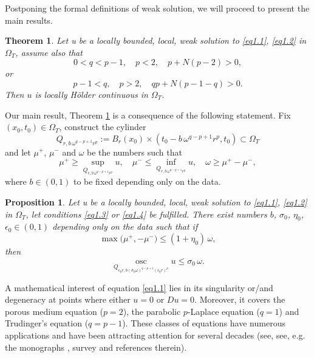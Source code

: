 \documentclass[a4paper,11pt,fullpage]{article}
\DeclareMathOperator*{\osc}{osc}
\numberwithin{equation}{section}
\newtheorem{theorem}{Theorem}[section]
\newtheorem{propo}{Proposition}[section]
\begin{document}
 
Postponing the formal definitions of weak solution, we will proceed to present the main results. 
\begin{theorem}\label{th1.1}
Let u be a locally bounded, local, weak solution to \eqref{eq1.1}, \eqref{eq1.2} in $\Omega_T$, assume also that 
\begin{equation}\label{eq1.3}
0<q<p-1,\quad p<2,\quad p+N(p-2)>0,
\end{equation}
or
\begin{equation}\label{eq1.4}
p-1<q, \quad p>2, \quad q p+N(p-1-q)>0.
\end{equation}
Then $u$ is locally H\"{o}lder continuous in $\Omega_T$.
\end{theorem}

Our main result, Theorem \ref{th1.1} is a consequence of the following statement. Fix $(x_0, t_0)\in \Omega_T$, construct the cylinder
$$Q_{r, b\, \omega^{q-p+1} r^p}:=B_r(x_0)\times (t_0- b\,\omega^{q-p+1} r^p, t_0)\subset \Omega_T$$ 
and let $\mu^+$, $\mu^-$ and $\omega$ be the numbers such that
\begin{equation}\label{eq1.5}
\mu^+\geqslant \sup\limits_{Q_{r, b\,\omega^{q-p+1} r^p}} u,\quad \mu^-\leqslant \inf\limits_{Q_{r, b\, \omega^{q-p+1} r^p}} u,\quad \omega \geqslant \mu^+ -\mu^-,
\end{equation}
where $b\in (0, 1)$ to be fixed depending only on the data.

\begin{propo}\label{pr1.1}
Let u be a locally bounded, local, weak solution to \eqref{eq1.1}, \eqref{eq1.2} in $\Omega_T$, let  conditions \eqref{eq1.3} or \eqref{eq1.4}  be fulfilled.
There exist numbers $b$, $\sigma_0$, $\eta_0$, $\epsilon_0\in (0, 1)$  depending only on the data such that if
\begin{equation}\label{eq1.6}
\max\big(\mu^+, -\mu^-\big)\leqslant (1+\eta_0)\, \omega,
\end{equation}
then
\begin{equation}\label{eq1.7}
\osc\limits_{Q_{\epsilon_0 r, b(\sigma_0 \omega)^{q-p+1} (\epsilon_0 r)^p}} u \leqslant \sigma_0\,\omega.
\end{equation}
\end{propo}



A mathematical interest of  equation \eqref{eq1.1} lies in its singularity or/and degeneracy at points where either $u = 0$ or $Du = 0$. Moreover, it covers the porous medium equation ($p = 2$), the parabolic $p$-Laplace equation ($q = 1$) and
 Trudinger's equation ($q = p -1$).  These classes of equations have numerous applications
 and have been attracting attention for several decades (see, see, e.g. the monographs \cite{DiB1, DiB3, Lad, Vaz, Wu }, survey \cite{DiB2}
 and references therein).  
 
\end{document}
